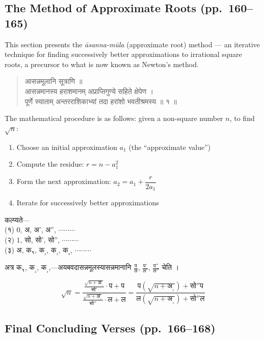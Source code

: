 \documentclass[11pt,a4paper]{article}
\newcommand{\dev}[1]{{\devanagarifont #1}}
\newenvironment{sanskritverse}{%
  \begin{verse}
}{%
  \end{verse}
}
\begin{document}
\subsection{The Method of Approximate Roots (pp.\ 160--165)}

This section presents the \textit{āsanna-mūla} (approximate root) method --- an iterative technique for finding successively better approximations to irrational square roots, a precursor to what is now known as Newton's method.

\begin{sanskritverse}
\dev{%
आसन्नमूलानि सूत्राणि ॥\\[0.5em]
आसन्नमानस्य हराशमानम् अप्राप्तिगुण्ये सहिते क्षेपेण ।\\
पूर्णे स्याताम् अन्तरराशिकाभ्यां तदा हरांशो भवतीश्रमस्य ॥ १ ॥}
\end{sanskritverse}

The mathematical procedure is as follows: given a non-square number $n$, to find $\sqrt{n}$:
\begin{enumerate}[label=\arabic*.]
  \item Choose an initial approximation $a_1$ (the ``approximate value'')
  \item Compute the residue: $r = n - a_1^2$
  \item Form the next approximation: $a_2 = a_1 + \dfrac{r}{2a_1}$
  \item Iterate for successively better approximations
\end{enumerate}

\dev{%
कल्प्यते—\\
(१) $0$, अ, अ', अ'', $\cdots\cdots\cdots$\\
(२) $1$, सो, सो', सो'', $\cdots\cdots\cdots$\\
(३) अ, क$_१$, क$_₂$, क$_₃$, क$_₄$, $\cdots\cdots\cdots$}

\dev{%
अत्र क$_१$, क$_₂$, क$_₃$,—अयबवदासन्नमूलस्यासन्नमानानि $\frac{\text{प}}{\text{ल}}$, $\frac{\text{प}'}{\text{ल}'}$, $\frac{\text{प}''}{\text{ल}''}$ चेति ।}

$$\sqrt{n} = \frac{\frac{\sqrt{n+\text{अ}_₁}}{\text{सो}'} \cdot \text{प} + \text{प}}{\frac{\sqrt{n+\text{अ}_₁}}{\text{सो}''} \cdot \text{ल} + \text{ल}} = \frac{\text{प}(\sqrt{n+\text{अ}_₁}) + \text{सो}''\text{प}}{\text{ल}(\sqrt{n+\text{अ}_₁}) + \text{सो}''\text{ल}}$$

\subsection{Final Concluding Verses (pp.\ 166--168)}
\end{document}
